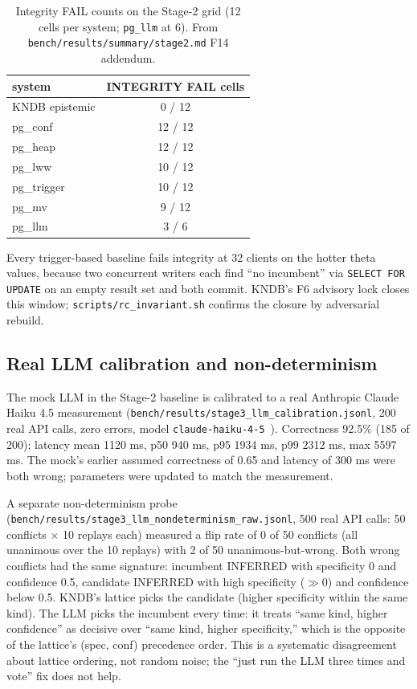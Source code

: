\documentclass[sigconf, nonacm]{acmart}
\begin{document}
\begin{table}[t]
\centering
\caption{Integrity FAIL counts on the Stage-2 grid (12 cells per system; \texttt{pg\_llm} at 6). From \texttt{bench/results/summary/stage2.md} F14 addendum.}
\label{tab:integrity}
\small
\begin{tabular}{lc}
\toprule
system & INTEGRITY FAIL cells \\
\midrule
KNDB epistemic & 0 / 12 \\
pg\_conf       & 12 / 12 \\
pg\_heap       & 12 / 12 \\
pg\_lww        & 10 / 12 \\
pg\_trigger    & 10 / 12 \\
pg\_mv         & 9 / 12 \\
pg\_llm        & 3 / 6 \\
\bottomrule
\end{tabular}
\end{table}

Every trigger-based baseline fails integrity at 32 clients on the hotter theta values, because two concurrent writers each find ``no incumbent'' via \texttt{SELECT FOR UPDATE} on an empty result set and both commit. KNDB's F6 advisory lock closes this window; \texttt{scripts/rc\_invariant.sh} confirms the closure by adversarial rebuild.

\subsection{Real LLM calibration and non-determinism}
The mock LLM in the Stage-2 baseline is calibrated to a real Anthropic Claude Haiku 4.5 measurement (\texttt{bench/results/stage3\_llm\_calibration.jsonl}, 200 real API calls, zero errors, model \texttt{claude-haiku-4-5}~\cite{anthropic2025haiku}). Correctness 92.5\% (185 of 200); latency mean 1120 ms, p50 940 ms, p95 1934 ms, p99 2312 ms, max 5597 ms. The mock's earlier assumed correctness of 0.65 and latency of 300 ms were both wrong; parameters were updated to match the measurement.

A separate non-determinism probe (\texttt{bench/results/stage3\_llm\_nondeterminism\_raw.jsonl}, 500 real API calls: 50 conflicts $\times$ 10 replays each) measured a flip rate of 0 of 50 conflicts (all unanimous over the 10 replays) with 2 of 50 unanimous-but-wrong. Both wrong conflicts had the same signature: incumbent INFERRED with specificity 0 and confidence 0.5, candidate INFERRED with high specificity ($\gg 0$) and confidence below 0.5. KNDB's lattice picks the candidate (higher specificity within the same kind). The LLM picks the incumbent every time: it treats ``same kind, higher confidence'' as decisive over ``same kind, higher specificity,'' which is the opposite of the lattice's (spec, conf) precedence order. This is a systematic disagreement about lattice ordering, not random noise; the ``just run the LLM three times and vote'' fix does not help.
\end{document}
